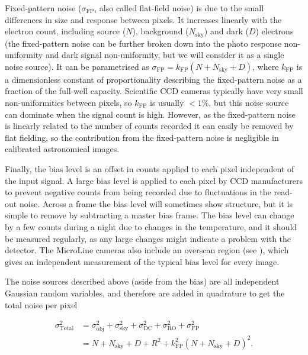 \begin{colsection}
Fixed-pattern noise ($\sigma_\text{FP}$, also called flat-field noise) is due to the small differences in size and response between pixels. It increases linearly with the electron count, including source ($N$), background ($N_\text{sky}$) and dark ($D$) electrons (the fixed-pattern noise can be further broken down into the photo response non-uniformity and dark signal non-uniformity, but we will consider it as a single noise source). It can be parametrised as $\sigma_\text{FP} = k_\text{FP}(N+N_\text{sky}+D)$, where $k_\text{FP}$ is a dimensionless constant of proportionality describing the fixed-pattern noise as a fraction of the full-well capacity. Scientific CCD cameras typically have very small non-uniformities between pixels, so $k_\text{FP}$ is usually $<1\%$, but this noise source can dominate when the signal count is high. However, as the fixed-pattern noise is linearly related to the number of counts recorded  it can easily be removed by flat fielding, so the contribution from the fixed-pattern noise is negligible in calibrated astronomical images.

Finally, the bias level is an offset in counts applied to each pixel independent of the input signal. A large bias level is applied to each pixel by CCD manufacturers to prevent negative counts from being recorded due to fluctuations in the read-out noise. Across a frame the bias level will sometimes show structure, but it is simple to remove by subtracting a master bias frame. The bias level can change by a few counts during a night due to changes in the temperature, and it should be measured regularly, as any large changes might indicate a problem with the detector. The MicroLine cameras also include an overscan region (see ), which gives an independent measurement of the typical bias level for every image.

The noise sources described above (aside from the bias) are all independent Gaussian random variables, and therefore are added in quadrature to get the total noise per pixel

\begin{equation}
    \begin{split}
        \sigma_\text{Total}^2 & = \sigma_\text{obj}^2 +
                                  \sigma_\text{sky}^2 +
                                  \sigma_\text{DC}^2 +
                                  \sigma_\text{RO}^2 +
                                  \sigma_\text{FP}^2 \\
                              & = N + N_\text{sky} + D + R^2 + k_\text{FP}^2{(N+N_\text{sky}+D)}^2.
    \end{split}
    \label{eq:noise}
\end{equation}

\end{colsection}

